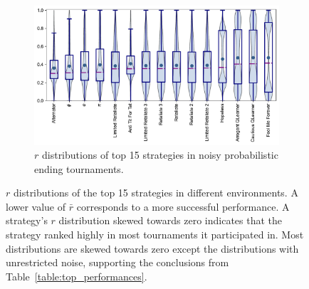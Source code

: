 \begin{figure}[!htbp]
\begin{subfigure}{0.485\textwidth}
        \includegraphics[width=\textwidth]{../images/r_distribution_probend_noise.pdf}
        \caption{$r$ distributions of top 15 strategies in noisy probabilistic ending tournaments.}
        \label{fig:probend_noise_results}
    \end{subfigure}
    \caption{\(r\) distributions of the top 15 strategies in different
    environments. A lower value of \(\bar{r}\) corresponds to a more successful
    performance. A strategy's \(r\) distribution skewed towards zero indicates
    that the strategy ranked highly in most tournaments it participated in. Most
    distributions are skewed towards zero except the distributions with
    unrestricted noise, supporting the conclusions from
    Table~\ref{table:top_performances}.}\label{fig:r_distributions}
\end{figure}

